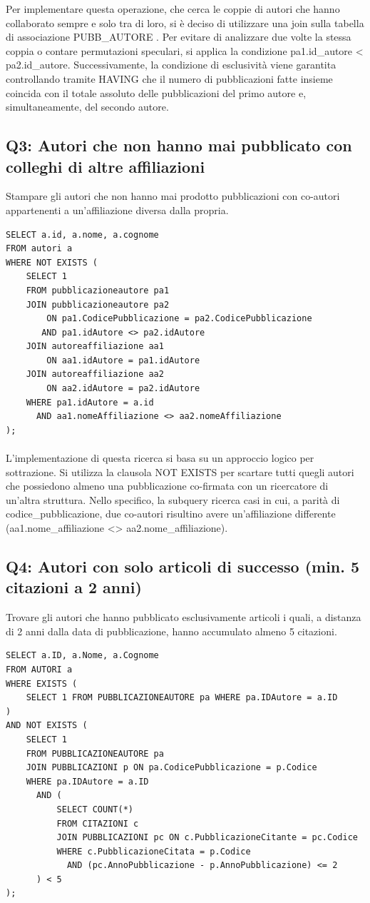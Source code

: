 \documentclass[a4paper,12pt]{article}
\begin{document}
Per implementare questa operazione, che cerca le coppie di autori che hanno collaborato sempre e solo tra di loro, si è deciso di utilizzare una join sulla tabella di associazione PUBB\_AUTORE . Per evitare di analizzare due volte la stessa coppia o contare permutazioni speculari, si applica la condizione pa1.id\_autore < pa2.id\_autore. Successivamente, la condizione di esclusività viene garantita controllando tramite HAVING che il numero di pubblicazioni fatte insieme coincida con il totale assoluto delle pubblicazioni del primo autore e, simultaneamente, del secondo autore.


\subsection*{Q3: Autori che non hanno mai pubblicato con colleghi di altre affiliazioni}
Stampare gli autori che non hanno mai prodotto pubblicazioni con co-autori appartenenti a un'affiliazione diversa dalla propria.
\begin{lstlisting}
SELECT a.id, a.nome, a.cognome
FROM autori a
WHERE NOT EXISTS (
    SELECT 1
    FROM pubblicazioneautore pa1
    JOIN pubblicazioneautore pa2
        ON pa1.CodicePubblicazione = pa2.CodicePubblicazione
       AND pa1.idAutore <> pa2.idAutore
    JOIN autoreaffiliazione aa1
        ON aa1.idAutore = pa1.idAutore
    JOIN autoreaffiliazione aa2
        ON aa2.idAutore = pa2.idAutore
    WHERE pa1.idAutore = a.id
      AND aa1.nomeAffiliazione <> aa2.nomeAffiliazione
);
\end{lstlisting}
\paragraph{}
L'implementazione di questa ricerca si basa su un approccio logico per sottrazione. Si utilizza la clausola NOT EXISTS per scartare tutti quegli autori che possiedono almeno una pubblicazione co-firmata con un ricercatore di un'altra struttura. Nello specifico, la subquery ricerca casi in cui, a parità di codice\_pubblicazione, due co-autori risultino avere un'affiliazione differente (aa1.nome\_affiliazione <> aa2.nome\_affiliazione).


\subsection*{Q4: Autori con solo articoli di successo (min. 5 citazioni a 2 anni)}
Trovare gli autori che hanno pubblicato esclusivamente articoli i quali, a distanza di 2 anni dalla data di pubblicazione, hanno accumulato almeno 5 citazioni.
\begin{lstlisting}
SELECT a.ID, a.Nome, a.Cognome
FROM AUTORI a
WHERE EXISTS (
    SELECT 1 FROM PUBBLICAZIONEAUTORE pa WHERE pa.IDAutore = a.ID
)
AND NOT EXISTS (
    SELECT 1
    FROM PUBBLICAZIONEAUTORE pa
    JOIN PUBBLICAZIONI p ON pa.CodicePubblicazione = p.Codice
    WHERE pa.IDAutore = a.ID
      AND (
          SELECT COUNT(*)
          FROM CITAZIONI c
          JOIN PUBBLICAZIONI pc ON c.PubblicazioneCitante = pc.Codice
          WHERE c.PubblicazioneCitata = p.Codice
            AND (pc.AnnoPubblicazione - p.AnnoPubblicazione) <= 2
      ) < 5
);
\end{lstlisting}
\end{document}
